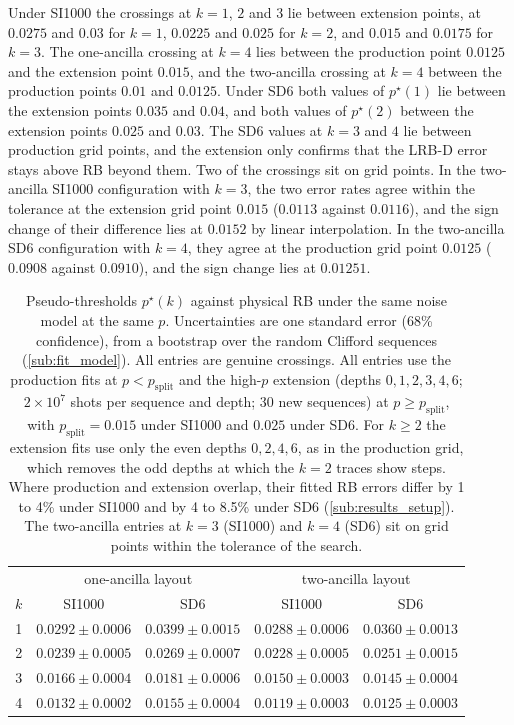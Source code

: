 Under SI1000 the crossings at $k = 1$, $2$ and $3$ lie between extension points, at $0.0275$ and $0.03$ for $k = 1$, $0.0225$ and $0.025$ for $k = 2$, and $0.015$ and $0.0175$ for $k = 3$. The one-ancilla crossing at $k = 4$ lies between the production point $0.0125$ and the extension point $0.015$, and the two-ancilla crossing at $k = 4$ between the production points $0.01$ and $0.0125$. Under SD6 both values of $p^\star(1)$ lie between the extension points $0.035$ and $0.04$, and both values of $p^\star(2)$ between the extension points $0.025$ and $0.03$. The SD6 values at $k = 3$ and $4$ lie between production grid points, and the extension only confirms that the LRB-D error stays above RB beyond them. Two of the crossings sit on grid points. In the two-ancilla SI1000 configuration with $k = 3$, the two error rates agree within the tolerance at the extension grid point $0.015$ ($0.0113$ against $0.0116$), and the sign change of their difference lies at $0.0152$ by linear interpolation. In the two-ancilla SD6 configuration with $k = 4$, they agree at the production grid point $0.0125$ ($0.0908$ against $0.0910$), and the sign change lies at $0.01251$.

\begin{table}[htb]
  \centering
  \begin{tabular}{c|cc|cc}
    \hline
    & \multicolumn{2}{c|}{one-ancilla layout} & \multicolumn{2}{c}{two-ancilla layout} \\
    $k$ & SI1000 & SD6 & SI1000 & SD6 \\
    \hline
    1 & $0.0292 \pm 0.0006$ & $0.0399 \pm 0.0015$ & $0.0288 \pm 0.0006$ & $0.0360 \pm 0.0013$ \\
    2 & $0.0239 \pm 0.0005$ & $0.0269 \pm 0.0007$ & $0.0228 \pm 0.0005$ & $0.0251 \pm 0.0015$ \\
    3 & $0.0166 \pm 0.0004$ & $0.0181 \pm 0.0006$ & $0.0150 \pm 0.0003$ & $0.0145 \pm 0.0004$ \\
    4 & $0.0132 \pm 0.0002$ & $0.0155 \pm 0.0004$ & $0.0119 \pm 0.0003$ & $0.0125 \pm 0.0003$ \\
    \hline
  \end{tabular}
  \caption{Pseudo-thresholds $p^\star(k)$ against physical RB under the same noise model at the same $p$. Uncertainties are one standard error (68\% confidence), from a bootstrap over the random Clifford sequences (\autoref{sub:fit_model}). All entries are genuine crossings. All entries use the production fits at $p < p_{\mathrm{split}}$ and the high-$p$ extension (depths $0, 1, 2, 3, 4, 6$; $2\times10^7$ shots per sequence and depth; 30 new sequences) at $p \ge p_{\mathrm{split}}$, with $p_{\mathrm{split}} = 0.015$ under SI1000 and $0.025$ under SD6. For $k \ge 2$ the extension fits use only the even depths $0, 2, 4, 6$, as in the production grid, which removes the odd depths at which the $k = 2$ traces show steps. Where production and extension overlap, their fitted RB errors differ by 1 to 4\% under SI1000 and by 4 to 8.5\% under SD6 (\autoref{sub:results_setup}). The two-ancilla entries at $k = 3$ (SI1000) and $k = 4$ (SD6) sit on grid points within the tolerance of the search.}
  \label{tab:pseudo_thresholds}
\end{table}

